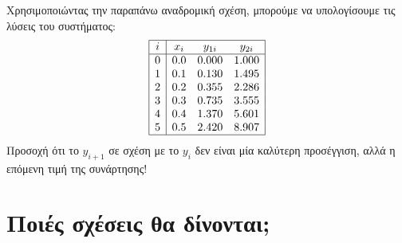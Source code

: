 \documentclass[11pt,a4paper,notitlepage,fleqn]{article}
\begin{document}
Χρησιμοποιώντας την παραπάνω αναδρομική σχέση, μπορούμε να υπολογίσουμε
τις λύσεις του συστήματος:
\[
\begin{array}{|c|ccc|}
\hline i & x_i & y_{1i} & y_{2i} \\ \hline
0 & 0.0 & 0.000 & 1.000 \\
1 & 0.1 & 0.130 & 1.495 \\
2 & 0.2 & 0.355 & 2.286 \\
3 & 0.3 & 0.735 & 3.555 \\
4 & 0.4 & 1.370 & 5.601 \\
5 & 0.5 & 2.420 & 8.907 \\ \hline
\end{array}
\]
Προσοχή ότι το \( y_{i+1} \) σε σχέση με το \( y_i \) δεν είναι μία
καλύτερη προσέγγιση, αλλά η επόμενη τιμή της συνάρτησης!

\section{Ποιές σχέσεις θα δίνονται;}
\end{document}

